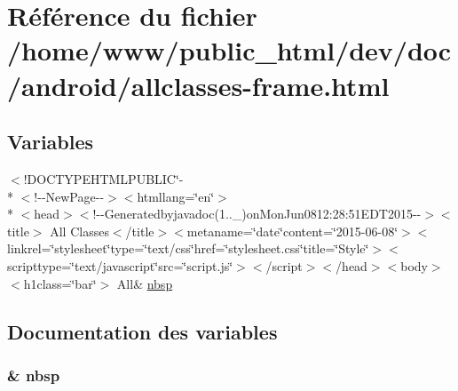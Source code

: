 \hypertarget{allclasses-frame_8html}{\section{Référence du fichier /home/www/public\-\_\-html/dev/doc/android/allclasses-\/frame.html}
\label{allclasses-frame_8html}
}
\subsection*{Variables}
\begin{DoxyCompactItemize}
\item 
$<$!D\-O\-C\-T\-Y\-P\-E\-H\-T\-M\-L\-P\-U\-B\-L\-I\-C\char`\"{}-\/\\*
$<$!-\/-\/New\-Page-\/-\/$>$$<$htmllang=\char`\"{}en\char`\"{}$>$\\*
$<$head$>$$<$!-\/-\/Generatedbyjavadoc(1..\-\_)on\-Mon\-Jun0812\-:28\-:51\-E\-D\-T2015-\/-\/$>$$<$title$>$ All Classes$<$/title$>$$<$metaname=\char`\"{}date\char`\"{}content=\char`\"{}2015-\/06-\/08\char`\"{}$>$$<$linkrel=\char`\"{}stylesheet\char`\"{}type=\char`\"{}text/css\char`\"{}href=\char`\"{}stylesheet.\-css\char`\"{}title=\char`\"{}\-Style\char`\"{}$>$$<$scripttype=\char`\"{}text/javascript\char`\"{}src=\char`\"{}script.\-js\char`\"{}$>$$<$/script$>$$<$/head$>$$<$body$>$$<$h1class=\char`\"{}bar\char`\"{}$>$ All\& \hyperlink{allclasses-frame_8html_aef915316f784c9063d942974538301a6}{nbsp}
\end{DoxyCompactItemize}


\subsection{Documentation des variables}
\hypertarget{allclasses-frame_8html_aef915316f784c9063d942974538301a6}{
\subsubsection[{nbsp}]{\setlength{\rightskip}{0pt plus 5cm}\& nbsp}}\label{allclasses-frame_8html_aef915316f784c9063d942974538301a6}
